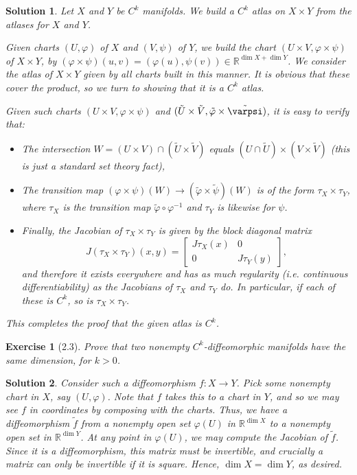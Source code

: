 \documentclass{article}
\theoremstyle{plain}
\newtheorem*{ex}{Exercise}
\theoremstyle{nonumberplain}
\newtheorem{sol}{Solution}
\newcommand{\R}{\mathbb{R}}
\begin{document}
\begin{sol}
Let $X$ and $Y$ be $C^k$ manifolds. We build a $C^k$ atlas on $X \times Y$ from the atlases for $X$ and $Y$.

Given charts $(U,\varphi)$ of $X$ and $(V,\psi)$ of $Y$, we build the chart $(U \times V, \varphi \times \psi)$ of $X \times Y$, by $(\varphi \times \psi)(u,v) = (\varphi(u), \psi(v)) \in \R^{\dim X + \dim Y}$. We consider the atlas of $X \times Y$ given by all charts built in this manner. It is obvious that these cover the product, so we turn to showing that it is a $C^k$ atlas.

Given such charts $(U \times V, \varphi \times \psi)$ and $(\tilde U \times \tilde V, \tilde \varphi \times \tilde \varpsi)$, it is easy to verify that:
\begin{itemize}
\item The intersection $W = (U \times V) \cap (\tilde U \times \tilde V)$ equals $(U \cap \tilde U) \times (V \times \tilde V)$ (this is just a standard set theory fact),
\item The transition map $(\varphi \times \psi)(W) \to (\tilde \varphi \times \tilde \psi)(W)$ is of the form $\tau_X \times \tau_Y$, where $\tau_X$ is the transition map $\tilde \varphi \circ \varphi^{-1}$ and $\tau_Y$ is likewise for $\psi$.
\item Finally, the Jacobian of $\tau_X \times \tau_Y$ is given by the block diagonal matrix
\begin{equation}
J(\tau_X \times \tau_Y)(x,y) = \begin{bmatrix}
J \tau_X(x) & 0 \\
0 & J \tau_Y(y)
\end{bmatrix},
\end{equation}
and therefore it exists everywhere and has as much regularity (i.e. continuous differentiability) as the Jacobians of $\tau_X$ and $\tau_Y$ do. In particular, if each of these is $C^k$, so is $\tau_X \times \tau_Y$.
\end{itemize}

This completes the proof that the given atlas is $C^k$.
\end{sol}

\begin{ex}[2.3]
Prove that two nonempty $C^k$-diffeomorphic manifolds have the same dimension, for $k > 0$.
\end{ex}

\begin{sol}
Consider such a diffeomorphism $f \colon X \to Y$. Pick some nonempty chart in $X$, say $(U,\varphi)$. Note that $f$ takes this to a chart in $Y$, and so we may see $f$ in coordinates by composing with the charts. Thus, we have a diffeomorphism $\tilde f$ from a nonempty open set $\varphi(U)$ in $\R^{\dim X}$ to a nonempty open set in $\R^{\dim Y}$. At any point in $\varphi(U)$, we may compute the Jacobian of $\tilde f$. Since it is a diffeomorphism, this matrix must be invertible, and crucially a matrix can only be invertible if it is square. Hence, $\dim X = \dim Y$, as desired.
\end{sol}
\end{document}
